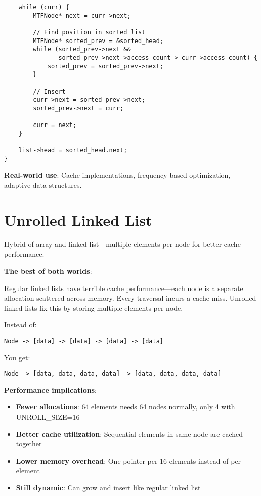 \begin{lstlisting}
    while (curr) {
        MTFNode* next = curr->next;

        // Find position in sorted list
        MTFNode* sorted_prev = &sorted_head;
        while (sorted_prev->next &&
               sorted_prev->next->access_count > curr->access_count) {
            sorted_prev = sorted_prev->next;
        }

        // Insert
        curr->next = sorted_prev->next;
        sorted_prev->next = curr;

        curr = next;
    }

    list->head = sorted_head.next;
}
\end{lstlisting}

\textbf{Real-world use}: Cache implementations, frequency-based optimization, adaptive data structures.

\section{Unrolled Linked List}

Hybrid of array and linked list---multiple elements per node for better cache performance.

\textbf{The best of both worlds}:

Regular linked lists have terrible cache performance---each node is a separate allocation scattered across memory. Every traversal incurs a cache miss. Unrolled linked lists fix this by storing multiple elements per node.

Instead of:
\begin{verbatim}
Node -> [data] -> [data] -> [data] -> [data]
\end{verbatim}

You get:
\begin{verbatim}
Node -> [data, data, data, data] -> [data, data, data, data]
\end{verbatim}

\textbf{Performance implications}:

\begin{itemize}
    \item \textbf{Fewer allocations}: 64 elements needs 64 nodes normally, only 4 with UNROLL\_SIZE=16
    \item \textbf{Better cache utilization}: Sequential elements in same node are cached together
    \item \textbf{Lower memory overhead}: One pointer per 16 elements instead of per element
    \item \textbf{Still dynamic}: Can grow and insert like regular linked list
\end{itemize}

